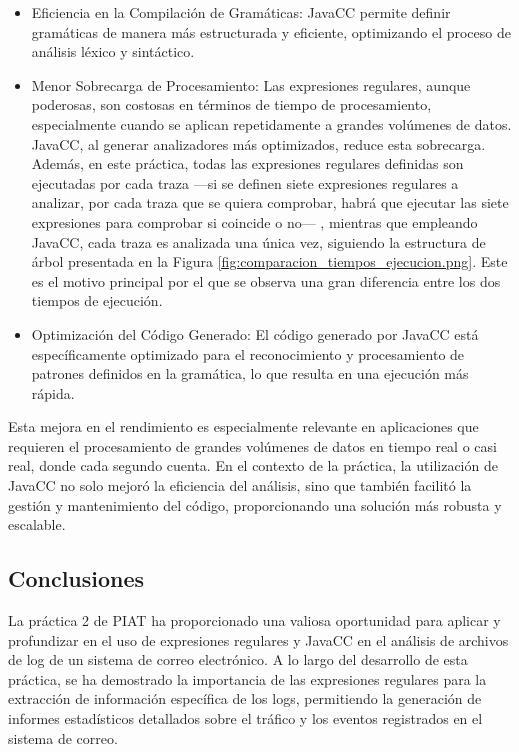 \begin{itemize}
\item Eficiencia en la Compilación de Gramáticas: JavaCC permite definir gramáticas de manera más estructurada y eficiente, optimizando el proceso de análisis léxico y sintáctico.
\item Menor Sobrecarga de Procesamiento: Las expresiones regulares, aunque poderosas, son costosas en términos de tiempo de procesamiento, especialmente cuando se aplican repetidamente a grandes volúmenes de datos. JavaCC, al generar analizadores más optimizados, reduce esta sobrecarga. Además, en este práctica, todas las expresiones regulares definidas son ejecutadas por cada traza ---si se definen siete expresiones regulares a analizar, por cada traza que se quiera comprobar, habrá que ejecutar las siete expresiones para comprobar si coincide o no--- , mientras que empleando JavaCC, cada traza es analizada una única vez, siguiendo la estructura de árbol presentada en la Figura \ref{fig:comparacion_tiempos_ejecucion.png}. Este es el motivo principal por el que se observa una gran diferencia entre los dos tiempos de ejecución.
\item Optimización del Código Generado: El código generado por JavaCC está específicamente optimizado para el reconocimiento y procesamiento de patrones definidos en la gramática, lo que resulta en una ejecución más rápida.
\end{itemize}

Esta mejora en el rendimiento es especialmente relevante en aplicaciones que requieren el procesamiento de grandes volúmenes de datos en tiempo real o casi real, donde cada segundo cuenta. En el contexto de la práctica, la utilización de JavaCC no solo mejoró la eficiencia del análisis, sino que también facilitó la gestión y mantenimiento del código, proporcionando una solución más robusta y escalable.

\subsection{Conclusiones}

\noindent La práctica 2 de PIAT ha proporcionado una valiosa oportunidad para aplicar y profundizar en el uso de expresiones regulares y JavaCC en el análisis de archivos de log de un sistema de correo electrónico. A lo largo del desarrollo de esta práctica, se ha demostrado la importancia de las expresiones regulares para la extracción de información específica de los logs, permitiendo la generación de informes estadísticos detallados sobre el tráfico y los eventos registrados en el sistema de correo.

